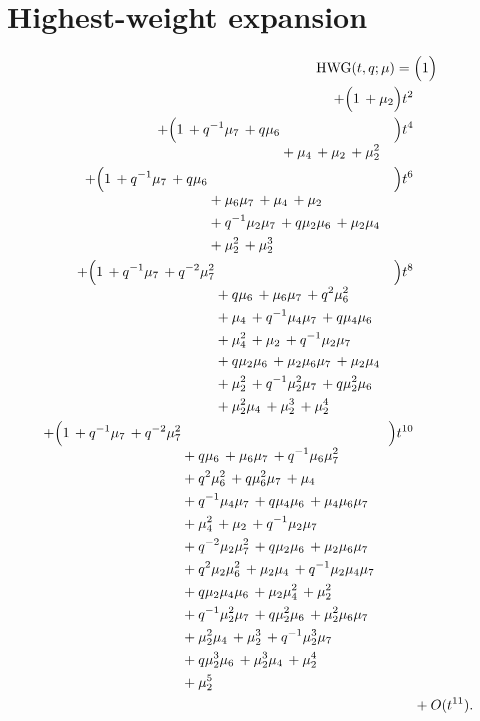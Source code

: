 \documentclass[10pt]{article}
\begin{document}
\section{Highest-weight expansion}
\[
\begin{aligned}
\mathrm{HWG}(t,q;\mu) ={}&
   \Bigl(1\Bigr) \\
  + \Bigl(1\,+\mu_2\Bigr)t^{2} \\
  + \Bigl(\begin{aligned}[t]1\,+q^{-1}\mu_7\,+q\mu_6 \\
  &{}+\mu_4\,+\mu_2\,+\mu_2^{2}\end{aligned}\Bigr)t^{4} \\
  + \Bigl(\begin{aligned}[t]1\,+q^{-1}\mu_7\,+q\mu_6 \\
  &{}+\mu_6\mu_7\,+\mu_4\,+\mu_2 \\
  &{}+q^{-1}\mu_2\mu_7\,+q\mu_2\mu_6\,+\mu_2\mu_4 \\
  &{}+\mu_2^{2}\,+\mu_2^{3}\end{aligned}\Bigr)t^{6} \\
  + \Bigl(\begin{aligned}[t]1\,+q^{-1}\mu_7\,+q^{-2}\mu_7^{2} \\
  &{}+q\mu_6\,+\mu_6\mu_7\,+q^{2}\mu_6^{2} \\
  &{}+\mu_4\,+q^{-1}\mu_4\mu_7\,+q\mu_4\mu_6 \\
  &{}+\mu_4^{2}\,+\mu_2\,+q^{-1}\mu_2\mu_7 \\
  &{}+q\mu_2\mu_6\,+\mu_2\mu_6\mu_7\,+\mu_2\mu_4 \\
  &{}+\mu_2^{2}\,+q^{-1}\mu_2^{2}\mu_7\,+q\mu_2^{2}\mu_6 \\
  &{}+\mu_2^{2}\mu_4\,+\mu_2^{3}\,+\mu_2^{4}\end{aligned}\Bigr)t^{8} \\
  + \Bigl(\begin{aligned}[t]1\,+q^{-1}\mu_7\,+q^{-2}\mu_7^{2} \\
  &{}+q\mu_6\,+\mu_6\mu_7\,+q^{-1}\mu_6\mu_7^{2} \\
  &{}+q^{2}\mu_6^{2}\,+q\mu_6^{2}\mu_7\,+\mu_4 \\
  &{}+q^{-1}\mu_4\mu_7\,+q\mu_4\mu_6\,+\mu_4\mu_6\mu_7 \\
  &{}+\mu_4^{2}\,+\mu_2\,+q^{-1}\mu_2\mu_7 \\
  &{}+q^{-2}\mu_2\mu_7^{2}\,+q\mu_2\mu_6\,+\mu_2\mu_6\mu_7 \\
  &{}+q^{2}\mu_2\mu_6^{2}\,+\mu_2\mu_4\,+q^{-1}\mu_2\mu_4\mu_7 \\
  &{}+q\mu_2\mu_4\mu_6\,+\mu_2\mu_4^{2}\,+\mu_2^{2} \\
  &{}+q^{-1}\mu_2^{2}\mu_7\,+q\mu_2^{2}\mu_6\,+\mu_2^{2}\mu_6\mu_7 \\
  &{}+\mu_2^{2}\mu_4\,+\mu_2^{3}\,+q^{-1}\mu_2^{3}\mu_7 \\
  &{}+q\mu_2^{3}\mu_6\,+\mu_2^{3}\mu_4\,+\mu_2^{4} \\
  &{}+\mu_2^{5}\end{aligned}\Bigr)t^{10} \\
  &+ O(t^{11}).
\end{aligned}
\]
\end{document}
